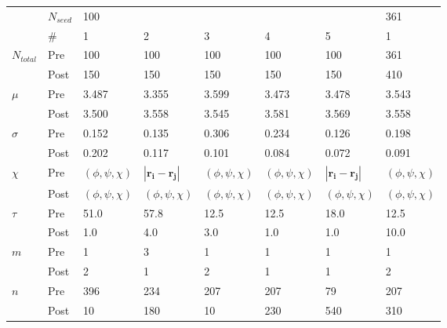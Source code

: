 \begin{table}
    \centering
    \begin{tabular}{|ll|lllll|l|}
    \hline
    &$N_{seed}$ & 100 & & & & &361\\
    &\#&1&2&3&4&5&1\\
    \hline\hline
    $N_{total}$&Pre&100&100&100&100&100&361\\
    &Post&150&150&150&150&150&410\\
    \hline
    $\mu$&Pre&3.487&3.355&3.599&3.473&3.478&3.543\\
    &Post&3.500&3.558&3.545&3.581&3.569&3.558\\
    \hline
    $\sigma$&Pre&0.152&0.135&0.306&0.234&0.126&0.198\\
    &Post&0.202&0.117&0.101&0.084&0.072&0.091\\
    \hline
    $\chi$&Pre&$(\phi,\psi,\chi)$&$|\mathbf{r_{i}}-\mathbf{r_{j}}|$&$(\phi,\psi,\chi)$&$(\phi,\psi,\chi)$&$|\mathbf{r_{i}}-\mathbf{r_{j}}|$&$(\phi,\psi,\chi)$\\
    &Post&$(\phi,\psi,\chi)$&$(\phi,\psi,\chi)$&$(\phi,\psi,\chi)$&$(\phi,\psi,\chi)$&$(\phi,\psi,\chi)$&$(\phi,\psi,\chi)$\\
    \hline
    $\tau$&Pre&51.0&57.8&12.5&12.5&18.0&12.5\\
    &Post&1.0&4.0&3.0&1.0&1.0&10.0\\
    \hline
    $m$&Pre&1&3&1&1&1&1\\
    &Post&2&1&2&1&1&2\\
    \hline
    $n$&Pre&396&234&207&207&79&207\\
    &Post&10&180&10&230&540&310\\
    \hline
    \end{tabular}
    \label{tab:aadh_opt_results}
\end{table}


